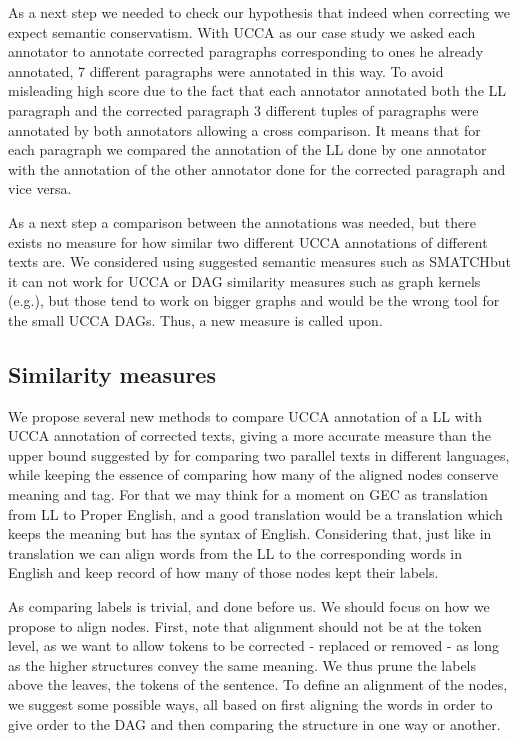 \documentclass[english]{article}
\begin{document}
As a next step we needed to check our hypothesis that indeed when correcting we expect semantic conservatism. With UCCA as our case study we asked each annotator to annotate corrected paragraphs corresponding
to ones he already annotated, 7 different paragraphs were annotated
in this way. To avoid misleading high score due to the fact that each
annotator annotated both the LL paragraph and the corrected
paragraph 3 different tuples of paragraphs were annotated by both
annotators allowing a cross comparison. It means that for each paragraph
we compared the annotation of the LL done by one annotator
with the annotation of the other annotator done for the corrected
paragraph and vice versa. 

As a next step a comparison between the annotations was needed, but
there exists no measure for how similar two different UCCA annotations
of different texts are. We considered using suggested semantic measures
such as SMATCH\cite{cai2013smatch}but it can not work for UCCA or
DAG similarity measures such as graph kernels (e.g.\cite{kashima2003marginalized}),
but those tend to work on bigger graphs and would be the wrong tool
for the small UCCA DAGs. Thus, a new measure is called upon.

\subsection{Similarity measures\label{subsec:Similarity-measures}}

We propose several new methods to compare UCCA annotation of a LL with UCCA annotation of corrected texts, giving a more accurate
measure than the upper bound suggested by \cite{sulem2015conceptual}for
comparing two parallel texts in different languages, while keeping
the essence of comparing how many of the aligned nodes conserve meaning
and tag. For that we may think for a moment on GEC as
translation from LL to Proper English, and a good translation
would be a translation which keeps the meaning but has the syntax
of English. Considering that, just like in translation we can align
words from the LL to the corresponding words in English
and keep record of how many of those nodes kept their labels.

As comparing labels is trivial, and done before us. We should focus on how we propose to
align nodes. First, note that alignment should not be at
the token level, as we want to allow tokens to be corrected - replaced or removed -
as long as the higher structures convey the same meaning. We thus
prune the labels above the leaves, the tokens of the sentence. To
define an alignment of the nodes, we suggest some possible ways, all
based on first aligning the words in order to give order to the DAG
and then comparing the structure in one way or another.
\end{document}

